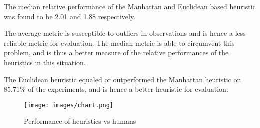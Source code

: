 The median relative performance of the Manhattan and Euclidean based heuristic was found to be 2.01 and 1.88 respectively.
 
The average metric is susceptible to outliers in observations and is hence a less reliable metric for evaluation. The median metric is able to circumvent this problem, and is thus a better measure of the relative performances of the heuristics in this situation.
  
The Euclidean heuristic equaled or outperformed the Manhattan heuristic on 85.71\% of the experiments, and is hence a better heuristic for evaluation.


\begin{figure}
  \texttt{[image: images/chart.png]}
  \caption{Performance of heuristics vs humans}
  \label{fig:chart1}
\end{figure}